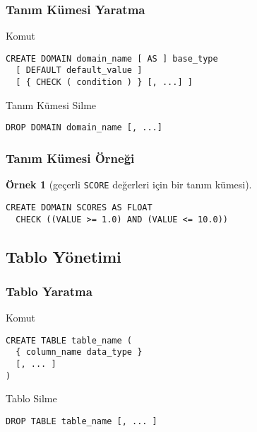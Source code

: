 \documentclass[dvipsnames]{beamer}
\theoremstyle{definition}
\theoremstyle{example}
\newtheorem{ornek}[theorem]{Örnek}
\theoremstyle{plain}
\begin{document}
\begin{frame}[fragile]
  \frametitle{Tanım Kümesi Yaratma}

  \begin{block}{Komut}
    \begin{lstlisting}
CREATE DOMAIN domain_name [ AS ] base_type
  [ DEFAULT default_value ]
  [ { CHECK ( condition ) } [, ...] ]
    \end{lstlisting}
  \end{block}

  \pause
  \medskip
  \begin{block}{Tanım Kümesi Silme}
    \begin{lstlisting}
DROP DOMAIN domain_name [, ...]
    \end{lstlisting}
  \end{block}
\end{frame}

\begin{frame}[fragile]
  \frametitle{Tanım Kümesi Örneği}

  \begin{ornek}[geçerli \texttt{SCORE} değerleri için bir tanım kümesi]
    \begin{lstlisting}
CREATE DOMAIN SCORES AS FLOAT
  CHECK ((VALUE >= 1.0) AND (VALUE <= 10.0))
    \end{lstlisting}
  \end{ornek}
\end{frame}

\subsection{Tablo Yönetimi}

\begin{frame}[fragile]
  \frametitle{Tablo Yaratma}

  \begin{block}{Komut}
    \begin{lstlisting}
CREATE TABLE table_name (
  { column_name data_type }
  [, ... ]
)
    \end{lstlisting}
  \end{block}

  \pause
  \medskip
  \begin{block}{Tablo Silme}
    \begin{lstlisting}
DROP TABLE table_name [, ... ]
    \end{lstlisting}
  \end{block}
\end{frame}
\end{document}
